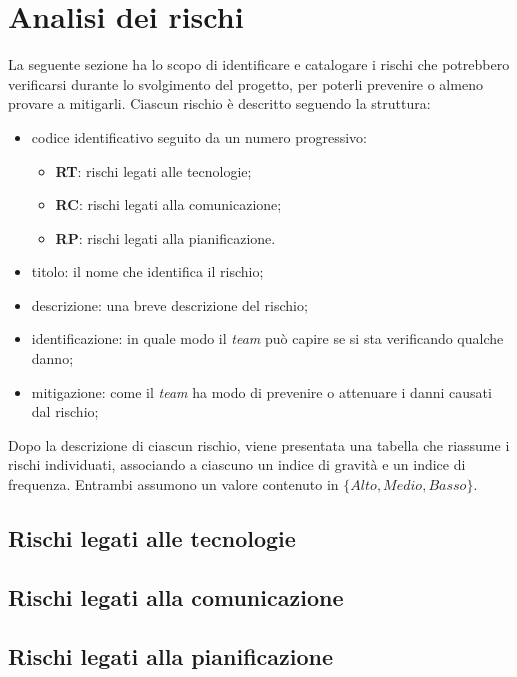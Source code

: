 \section{Analisi dei rischi}

La seguente sezione ha lo scopo di identificare e catalogare i rischi che
potrebbero verificarsi durante lo svolgimento del progetto, per poterli
prevenire o almeno provare a mitigarli.
Ciascun rischio è descritto seguendo la struttura:
\begin{itemize}
	\item codice identificativo seguito da un numero progressivo:
	      \begin{itemize}
		      \item \textbf{RT}: rischi legati alle tecnologie;
		      \item \textbf{RC}: rischi legati alla comunicazione;
		      \item \textbf{RP}: rischi legati alla pianificazione.
	      \end{itemize}

	\item titolo: il nome che identifica il rischio;

	\item descrizione: una breve descrizione del rischio;

	\item identificazione: in quale modo il \textit{team} può capire se si sta
	      verificando qualche danno;

	\item mitigazione: come il \textit{team} ha modo di prevenire o
	      attenuare i danni causati dal rischio;
\end{itemize}

Dopo la descrizione di ciascun rischio, viene presentata una tabella che
riassume i rischi individuati, associando a ciascuno un indice di gravità e un
indice di frequenza. Entrambi assumono un valore contenuto in
$\{Alto, Medio, Basso\}$.


\subsection{Rischi legati alle tecnologie}



\subsection{Rischi legati alla comunicazione}

\subsection{Rischi legati alla pianificazione}
